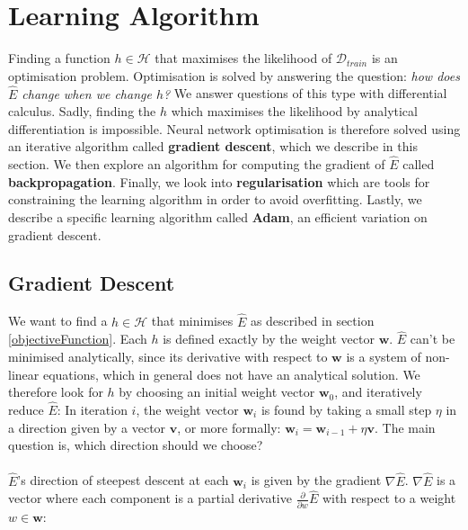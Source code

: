 \section{Learning Algorithm}
\label{learningAlgorithm}
Finding a function $h \in \mathcal{H}$ that maximises the likelihood of $\mathcal{D}_{train}$ is an optimisation problem. Optimisation is solved by answering the question: \textit{how does $\hat{E}$ change when we change $h$?} We answer questions of this type with differential calculus. Sadly, finding the $h$ which maximises the likelihood by analytical differentiation is impossible. Neural network optimisation is therefore solved using an iterative algorithm called \textbf{gradient descent}, which we describe in this section. We then explore an algorithm for computing the gradient of $\hat{E}$ called \textbf{backpropagation}. Finally, we look into \textbf{regularisation} which are tools for constraining the learning algorithm in order to avoid overfitting. Lastly, we describe a specific learning algorithm called \textbf{Adam}, an efficient variation on gradient descent.

\subsection{Gradient Descent}
\label{gradient_descent}
We want to find a $h \in \mathcal{H}$ that minimises $\hat{E}$ as described in section \ref{objectiveFunction}. Each $h$ is defined exactly by the weight vector $\mathbf{w}$. $\hat{E}$ can't be minimised analytically, since its derivative with respect to $\mathbf{w}$ is a system of non-linear equations, which in general does not have an analytical solution. We therefore look for $h$ by choosing an initial weight vector $\mathbf{w}_0$, and iteratively reduce $\hat{E}$: In iteration $i$, the weight vector $\mathbf{w}_i$ is found by taking a small step $\eta$ in a direction given by a vector $\mathbf{v}$, or more formally: $\mathbf{w}_i = \mathbf{w}_{i-1} + \eta\mathbf{v}$. The main question is, which direction should we choose? 
\\\\ 
$\hat{E}$'s direction of steepest descent at each $\mathbf{w}_i$ is given by the gradient $\nabla\hat{E}$. $\nabla \hat{E}$ is a vector where each component is a partial derivative $\frac{\partial}{\partial w}\hat{E}$ with respect to a weight $w \in \mathbf{w}$:

